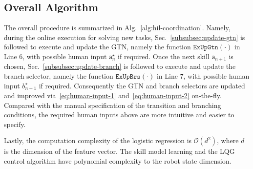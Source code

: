 \subsection{Overall Algorithm}\label{subsubsec:overall-algo}
The overall procedure is summarized in Alg.~\ref{alg:hil-coordination}.
Namely, during the online execution for solving new tasks, 
Sec.~\ref{subsubsec:update-gtn} is followed to execute and update the GTN, 
namely the function $\texttt{ExUpGtn}(\cdot)$ in Line 6, 
with possible human input $\mathsf{a}^\star_n$ if required. 
Once the next skill $\mathsf{a}_{n+1}$ is chosen, 
Sec.~\ref{subsubsec:update-branch} is followed to execute and update the branch selector, 
namely the function $\texttt{ExUpBrs}(\cdot)$ in Line 7, 
with possible human input $b^\star_{n+1}$ if required.
Consequently the GTN and branch selectors are updated and improved via~\eqref{eq:human-input-1} and~\eqref{eq:human-input-2} {on-the-fly}.
Compared with the manual specification of the transition and branching conditions,  
the required human inputs above are more intuitive and easier to specify. 

Lastly, the computation complexity of the logistic regression is $\mathcal{O}(d^2)$, where $d$ is the dimension of the feature vector.
The skill model learning and the LQG control algorithm have polynomial complexity to the robot state dimension. 
